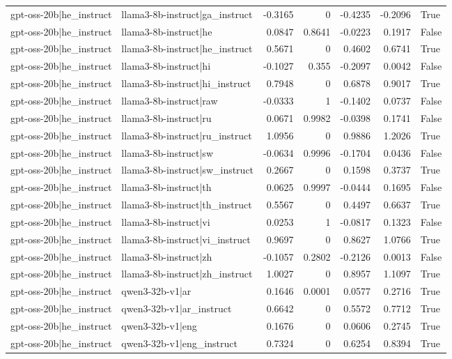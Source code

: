 \begin{table}
\begin{tabular}{l l r r r r l}
gpt-oss-20b|he_instruct & llama3-8b-instruct|ga_instruct & -0.3165 & 0 & -0.4235 & -0.2096 & True \\
gpt-oss-20b|he_instruct & llama3-8b-instruct|he & 0.0847 & 0.8641 & -0.0223 & 0.1917 & False \\
gpt-oss-20b|he_instruct & llama3-8b-instruct|he_instruct & 0.5671 & 0 & 0.4602 & 0.6741 & True \\
gpt-oss-20b|he_instruct & llama3-8b-instruct|hi & -0.1027 & 0.355 & -0.2097 & 0.0042 & False \\
gpt-oss-20b|he_instruct & llama3-8b-instruct|hi_instruct & 0.7948 & 0 & 0.6878 & 0.9017 & True \\
gpt-oss-20b|he_instruct & llama3-8b-instruct|raw & -0.0333 & 1 & -0.1402 & 0.0737 & False \\
gpt-oss-20b|he_instruct & llama3-8b-instruct|ru & 0.0671 & 0.9982 & -0.0398 & 0.1741 & False \\
gpt-oss-20b|he_instruct & llama3-8b-instruct|ru_instruct & 1.0956 & 0 & 0.9886 & 1.2026 & True \\
gpt-oss-20b|he_instruct & llama3-8b-instruct|sw & -0.0634 & 0.9996 & -0.1704 & 0.0436 & False \\
gpt-oss-20b|he_instruct & llama3-8b-instruct|sw_instruct & 0.2667 & 0 & 0.1598 & 0.3737 & True \\
gpt-oss-20b|he_instruct & llama3-8b-instruct|th & 0.0625 & 0.9997 & -0.0444 & 0.1695 & False \\
gpt-oss-20b|he_instruct & llama3-8b-instruct|th_instruct & 0.5567 & 0 & 0.4497 & 0.6637 & True \\
gpt-oss-20b|he_instruct & llama3-8b-instruct|vi & 0.0253 & 1 & -0.0817 & 0.1323 & False \\
gpt-oss-20b|he_instruct & llama3-8b-instruct|vi_instruct & 0.9697 & 0 & 0.8627 & 1.0766 & True \\
gpt-oss-20b|he_instruct & llama3-8b-instruct|zh & -0.1057 & 0.2802 & -0.2126 & 0.0013 & False \\
gpt-oss-20b|he_instruct & llama3-8b-instruct|zh_instruct & 1.0027 & 0 & 0.8957 & 1.1097 & True \\
gpt-oss-20b|he_instruct & qwen3-32b-v1|ar & 0.1646 & 0.0001 & 0.0577 & 0.2716 & True \\
gpt-oss-20b|he_instruct & qwen3-32b-v1|ar_instruct & 0.6642 & 0 & 0.5572 & 0.7712 & True \\
gpt-oss-20b|he_instruct & qwen3-32b-v1|eng & 0.1676 & 0 & 0.0606 & 0.2745 & True \\
gpt-oss-20b|he_instruct & qwen3-32b-v1|eng_instruct & 0.7324 & 0 & 0.6254 & 0.8394 & True \\

\end{tabular}
\end{table}

